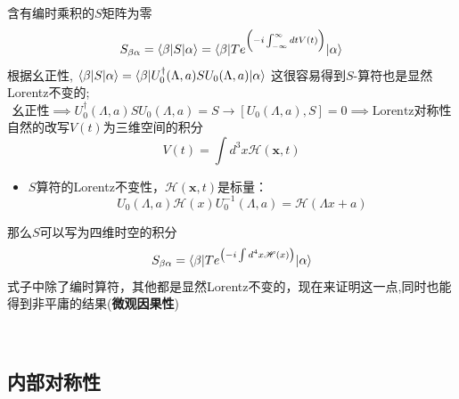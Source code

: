 含有编时乘积的$S$矩阵为零
\begin{equation}
            S_{\beta\alpha}=\braket{\beta|S|\alpha}=\braket{\beta|Te^{\left(-i\int_{-\infty}^{\infty} dtV(t)\right)}|\alpha}
\end{equation}
根据幺正性,
        $\braket{\beta|S |\alpha}=\braket{\beta|U_0^\dagger(\Lambda,a)SU_0(\Lambda,a)|\alpha}$
 这很容易得到$S$-算符也是显然Lorentz不变的; 
\begin{equation}
    \text{幺正性}\implies U_0^\dagger(\Lambda,a)SU_0(\Lambda,a)=S\to  [U_0(\Lambda,a),S]=0   \implies\text{Lorentz对称性}  
\end{equation}
自然的改写$V(t)$为三维空间的积分
\begin{equation}
    V(t)=\int d^3x \mathscr{H}(\boldsymbol{x},t)
\end{equation}\begin{itemize}
    \item $S$算符的Lorentz不变性，$\mathscr{H}(\boldsymbol{x},t)$是标量：
    \begin{equation}
        U_0(\Lambda,a)\mathscr{H}(x)U_0^{-1}(\Lambda,a)=\mathscr{H}(\Lambda x+a)
    \end{equation}
\end{itemize}
那么$S$可以写为四维时空的积分
\begin{equation}
    S_{\beta\alpha}=\braket{\beta|Te^{\left(-i\int d^4x\mathscr{H}(x)\right)}|\alpha}
\end{equation}
式子中除了编时算符，其他都是显然Lorentz不变的，现在来证明这一点,同时也能得到非平庸的结果(\textbf{微观因果性})
\begin{center}
    \vspace{2ex}
        \text{\color{red}\Large ***}\\
    \vspace{2ex}
\end{center}


\subsection{内部对称性}